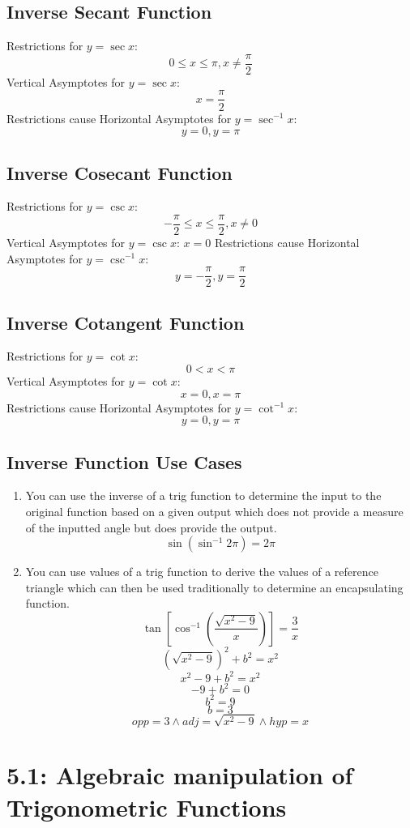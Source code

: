 \documentclass{article}
\begin{document}
\subsection{Inverse Secant Function}
Restrictions for $y=\sec x$:
\[0\le x \le \pi, x \ne \frac{\pi}{2}\]
Vertical Asymptotes for $y=\sec x$:
\[x=\frac{\pi}{2}\]
Restrictions cause Horizontal Asymptotes for $y=\sec^{-1}x$:
\[y=0,y=\pi\]

\subsection{Inverse Cosecant Function}
Restrictions for $y=\csc x$:
\[-\frac{\pi}{2}\le x \le \frac{\pi}{2},x\ne 0\]
Vertical Asymptotes for $y=\csc x$:
$x = 0$
Restrictions cause Horizontal Asymptotes for $y=\csc^{-1}x$:
\[y=-\frac{\pi}{2},y=\frac{\pi}{2}\]

\subsection{Inverse Cotangent Function}
Restrictions for $y =\cot x$:
\[0<x<\pi\]
Vertical Asymptotes for $y=\cot x$:
\[x=0, x=\pi\]
Restrictions cause Horizontal Asymptotes for $y=\cot^{-1}x$:
\[y=0,y=\pi\]

\subsection{Inverse Function Use Cases}
\begin{enumerate}
  \item You can use the inverse of a trig function to determine the input to the
original function based on a given output which does not provide a measure of
the inputted angle but does provide the output. 
\[\sin(\sin^{-1}2\pi)=2\pi\]

  \item You can use values of a trig function to derive the values of a
    reference triangle which can then be used traditionally to determine an
    encapsulating function. 
    \[\tan{\left[\cos^{-1}\left(\frac{\sqrt{x^2-9}}{x}\right)\right]}=\frac{3}{x}\]
    \[\left(\sqrt{x^2-9}\right)^2+b^2=x^2\] 
    \[x^2-9+b^2=x^2\]
    \[-9+b^2=0\]
    \[b^2=9\]
    \[b=3\]
    \[opp=3\land adj=\sqrt{x^2-9}\land hyp=x\]
\end{enumerate}

\section{5.1: Algebraic manipulation of Trigonometric Functions}
\end{document}
